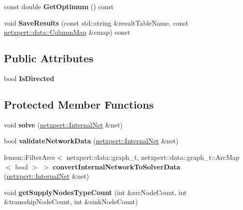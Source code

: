 \begin{DoxyCompactItemize}
\item 
const double {\bfseries Get\+Optimum} () const \hypertarget{classnetxpert_1_1MinCostFlow_ab4201f39d97364c9b0766b2c4f6415b0}{}\label{classnetxpert_1_1MinCostFlow_ab4201f39d97364c9b0766b2c4f6415b0}

\item 
void {\bfseries Save\+Results} (const std\+::string \&result\+Table\+Name, const \hyperlink{structnetxpert_1_1data_1_1ColumnMap}{netxpert\+::data\+::\+Column\+Map} \&cmap) const \hypertarget{classnetxpert_1_1MinCostFlow_a8f0f6280d112e40d2215dcba35022ef5}{}\label{classnetxpert_1_1MinCostFlow_a8f0f6280d112e40d2215dcba35022ef5}

\end{DoxyCompactItemize}
\subsection*{Public Attributes}
\begin{DoxyCompactItemize}
\item 
bool {\bfseries Is\+Directed}\hypertarget{classnetxpert_1_1MinCostFlow_ac9f9eec0385917e499121a44a7a5cc7c}{}\label{classnetxpert_1_1MinCostFlow_ac9f9eec0385917e499121a44a7a5cc7c}

\end{DoxyCompactItemize}
\subsection*{Protected Member Functions}
\begin{DoxyCompactItemize}
\item 
void {\bfseries solve} (\hyperlink{classnetxpert_1_1InternalNet}{netxpert\+::\+Internal\+Net} \&net)\hypertarget{classnetxpert_1_1MinCostFlow_aa488ec0d0eb1b492bae093ae3cec7040}{}\label{classnetxpert_1_1MinCostFlow_aa488ec0d0eb1b492bae093ae3cec7040}

\item 
bool {\bfseries validate\+Network\+Data} (\hyperlink{classnetxpert_1_1InternalNet}{netxpert\+::\+Internal\+Net} \&net)\hypertarget{classnetxpert_1_1MinCostFlow_a30d7985e7f5149476c3442146204f709}{}\label{classnetxpert_1_1MinCostFlow_a30d7985e7f5149476c3442146204f709}

\item 
lemon\+::\+Filter\+Arcs$<$ netxpert\+::data\+::graph\+\_\+t, netxpert\+::data\+::graph\+\_\+t\+::\+Arc\+Map$<$ bool $>$ $>$ {\bfseries convert\+Internal\+Network\+To\+Solver\+Data} (\hyperlink{classnetxpert_1_1InternalNet}{netxpert\+::\+Internal\+Net} \&net)\hypertarget{classnetxpert_1_1MinCostFlow_a87acb5c57d7c13dc4ce87751bd112d30}{}\label{classnetxpert_1_1MinCostFlow_a87acb5c57d7c13dc4ce87751bd112d30}

\item 
void {\bfseries get\+Supply\+Nodes\+Type\+Count} (int \&src\+Node\+Count, int \&transship\+Node\+Count, int \&sink\+Node\+Count)\hypertarget{classnetxpert_1_1MinCostFlow_af43ab101328511e444adac86b25076f6}{}\label{classnetxpert_1_1MinCostFlow_af43ab101328511e444adac86b25076f6}

\end{DoxyCompactItemize}
